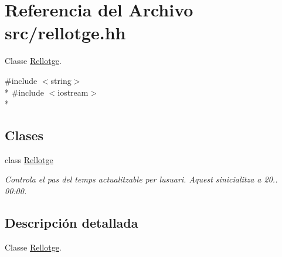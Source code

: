 \hypertarget{rellotge_8hh}{}\section{Referencia del Archivo src/rellotge.hh}
\label{rellotge_8hh}


Classe \hyperlink{class_rellotge}{Rellotge}.  


{\ttfamily \#include $<$string$>$}\\*
{\ttfamily \#include $<$iostream$>$}\\*
\subsection*{Clases}
\begin{DoxyCompactItemize}
\item 
class \hyperlink{class_rellotge}{Rellotge}
\begin{DoxyCompactList}\small\item\em Controla el pas del temps actualitzable per l\textquotesingle{}usuari. Aquest s\textquotesingle{}inicialitza a 20.. 00\+:00. \end{DoxyCompactList}\end{DoxyCompactItemize}


\subsection{Descripción detallada}
Classe \hyperlink{class_rellotge}{Rellotge}. 

